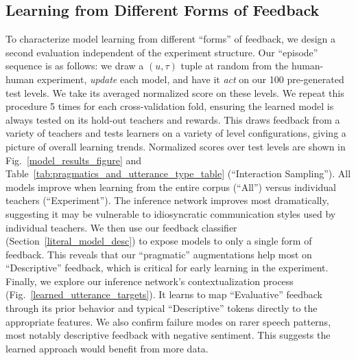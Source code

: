 \documentclass[letterpaper]{article} %
\begin{document}
\subsection{Learning from Different Forms of Feedback}
\label{random_sample_interactions}
\label{feedback_types}
To characterize model learning from different ``forms'' of feedback, we design a second evaluation independent of the experiment structure. Our ``episode'' sequence is as follows: we draw a $(u, \tau)$ tuple at random from the human-human experiment, \emph{update} each model, and have it \emph{act} on our 100 pre-generated test levels. We take its averaged normalized score on these levels. We repeat this procedure 5 times for each cross-validation fold, ensuring the learned model is always tested on its hold-out teachers and rewards. This draws feedback from a variety of teachers and tests learners on a variety of level configurations, giving a picture of overall learning trends. Normalized scores over test levels are shown in Fig.~\ref{model_results_figure} and Table~\ref{tab:pragmatics_and_utterance_type_table} (``Interaction Sampling''). All models improve when learning from the entire corpus (``All'') versus individual teachers (``Experiment''). The inference network improves most dramatically, suggesting it may be vulnerable to idiosyncratic communication styles used by individual teachers. We then use our feedback classifier (Section~\ref{literal_model_desc}) to expose models to only a single form of feedback. This reveals that our ``pragmatic'' augmentations help most on ``Descriptive'' feedback, which is critical for early learning in the experiment. Finally, we explore our inference network's contextualization process (Fig.~\ref{learned_utterance_targets}). It learns to map ``Evaluative'' feedback through its prior behavior and typical ``Descriptive'' tokens directly to the appropriate features. We also confirm failure modes on rarer speech patterns, most notably descriptive feedback with negative sentiment. This suggests the learned approach would benefit from more data.
\end{document}
